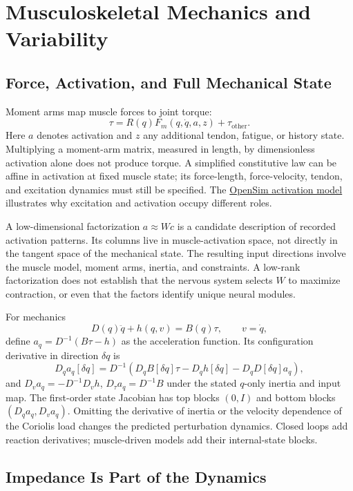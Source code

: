\documentclass[
  10pt,
  letterpaper,
  DIV=11,
  numbers=noendperiod]{scrartcl}
\begin{document}
\section{Musculoskeletal Mechanics and
Variability}\label{musculoskeletal-mechanics-and-variability}

\subsection{Force, Activation, and Full Mechanical
State}\label{force-activation-and-full-mechanical-state}

Moment arms map muscle forces to joint torque: \[
\tau=R(q)F_m(q,\dot q,a,z)+\tau_{\mathrm{other}}.
\] Here \(a\) denotes activation and \(z\) any additional tendon,
fatigue, or history state. Multiplying a moment-arm matrix, measured in
length, by dimensionless activation alone does not produce torque. A
simplified constitutive law can be affine in activation at fixed muscle
state; its force-length, force-velocity, tendon, and excitation dynamics
must still be specified. The
\href{https://opensimconfluence.atlassian.net/wiki/spaces/OpenSim/pages/53090590}{OpenSim
activation model} illustrates why excitation and activation occupy
different roles.

A low-dimensional factorization \(a\approx Wc\) is a candidate
description of recorded activation patterns. Its columns live in
muscle-activation space, not directly in the tangent space of the
mechanical state. The resulting input directions involve the muscle
model, moment arms, inertia, and constraints. A low-rank factorization
does not establish that the nervous system selects \(W\) to maximize
contraction, or even that the factors identify unique neural modules.

For mechanics \[
D(q)\ddot q+h(q,v)=B(q)\tau,\qquad v=\dot q,
\] define \(a_q=D^{-1}(B\tau-h)\) as the acceleration function. Its
configuration derivative in direction \(\delta q\) is \[
D_qa_q[\delta q]=D^{-1}\left(D_qB[\delta q]\tau-D_qh[\delta q]-D_qD[\delta q]a_q\right),
\] and \(D_va_q=-D^{-1}D_vh\), \(D_\tau a_q=D^{-1}B\) under the stated
\(q\)-only inertia and input map. The first-order state Jacobian has top
blocks \((0,I)\) and bottom blocks \((D_qa_q,D_va_q)\). Omitting the
derivative of inertia or the velocity dependence of the Coriolis load
changes the predicted perturbation dynamics. Closed loops add reaction
derivatives; muscle-driven models add their internal-state blocks.

\subsection{Impedance Is Part of the
Dynamics}\label{impedance-is-part-of-the-dynamics}
\end{document}
